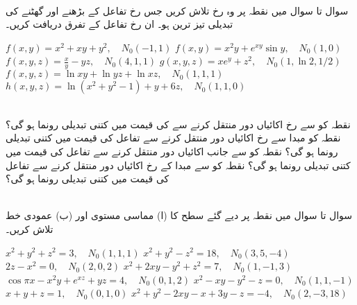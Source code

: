 \\
سوال  تا سوال  میں نقطہ   پر  وہ رخ تلاش کریں جس رخ تفاعل کے بڑھنے اور گھٹنے کی تبدیلی تیز ترین ہو۔ ان رخ تفاعل کے تفرق دریافت کریں۔

$f(x,y)=x^2+xy+y^2,\quad N_0(-1,1)$
$f(x,y)=x^2y+e^{xy}\sin y,\quad N_0(1,0)$
$f(x,y,z)=\frac{x}{y}-yz,\quad N_0(4,1,1)$
$g(x,y,z)=xe^y+z^2,\quad N_0(1,\ln 2,1/2)$
$f(x,y,z)=\ln xy+\ln yz+\ln xz,\quad N_0(1,1,1)$
$h(x,y,z)=\ln(x^2+y^2-1)+y+6z,\quad N_0(1,1,0)$

\\
نقطہ   کو  سے رخ    اکائیاں دور منتقل کرنے سے   کی قیمت میں کتنی تبدیلی رونما ہو گی؟
نقطہ   کو مبدا  سے رخ    اکائیاں دور منتقل کرنے سے تفاعل    کی قیمت میں کتنی تبدیلی رونما ہو گی؟
نقطہ   کو  سے   جانب       اکائیاں دور منتقل کرنے سے تفاعل    کی قیمت میں کتنی تبدیلی رونما ہو گی؟
نقطہ   کو سے مبدا  کے   رخ    اکائیاں دور منتقل کرنے سے تفاعل    کی قیمت میں کتنی تبدیلی رونما ہو گی؟

\\
سوال  تا سوال  میں  نقطہ  پر دیے گئے   سطح کا  (ا) مماسی مستوی اور (ب) عمودی خط تلاش کریں۔

$x^2+y^2+z^2=3,\quad N_0(1,1,1)$
$x^2+y^2-z^2=18,\quad N_0(3,5,-4)$
$2z-x^2=0,\quad N_0(2,0,2)$
$x^2+2xy-y^2+z^2=7,\quad N_0(1,-1,3)$
$\cos \pi x-x^2y+e^{xz}+yz=4,\quad N_0(0,1,2)$
$x^2-xy-y^2-z=0,\quad N_0(1,1,-1)$
$x+y+z=1,\quad N_0(0,1,0)$
$x^2+y^2-2xy-x+3y-z=-4,\quad N_0(2,-3,18)$

